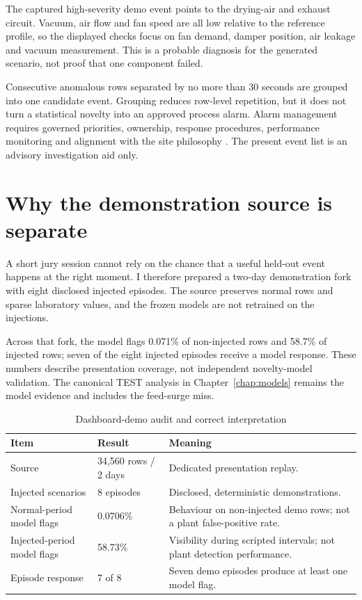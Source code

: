 The captured high-severity demo event points to the drying-air and exhaust circuit. Vacuum, air flow and fan speed are all low relative to the reference profile, so the displayed checks focus on fan demand, damper position, air leakage and vacuum measurement. This is a probable diagnosis for the generated scenario, not proof that one component failed.

Consecutive anomalous rows separated by no more than 30 seconds are grouped into one candidate event. Grouping reduces row-level repetition, but it does not turn a statistical novelty into an approved process alarm. Alarm management requires governed priorities, ownership, response procedures, performance monitoring and alignment with the site philosophy \cite{iec62682}. The present event list is an advisory investigation aid only.

\section{Why the demonstration source is separate}

A short jury session cannot rely on the chance that a useful held-out event happens at the right moment. I therefore prepared a two-day demonstration fork with eight disclosed injected episodes. The source preserves normal rows and sparse laboratory values, and the frozen models are not retrained on the injections.

Across that fork, the model flags 0.071\% of non-injected rows and 58.7\% of injected rows; seven of the eight injected episodes receive a model response. These numbers describe presentation coverage, not independent novelty-model validation. The canonical TEST analysis in Chapter~\ref{chap:models} remains the model evidence and includes the feed-surge miss.

\begin{table}[htbp]
\centering\small
\caption{Dashboard-demo audit and correct interpretation}
\label{tab:dashboard-demo}
\begin{tabularx}{\textwidth}{@{}p{}p{}Y@{}}
\toprule
Item & Result & Meaning \\
\midrule
Source & 34,560 rows / 2 days & Dedicated presentation replay. \\
Injected scenarios & 8 episodes & Disclosed, deterministic demonstrations. \\
Normal-period model flags & 0.0706\% & Behaviour on non-injected demo rows; not a plant false-positive rate. \\
Injected-period model flags & 58.73\% & Visibility during scripted intervals; not plant detection performance. \\
Episode response & 7 of 8 & Seven demo episodes produce at least one model flag. \\
\bottomrule
\end{tabularx}
\end{table}


